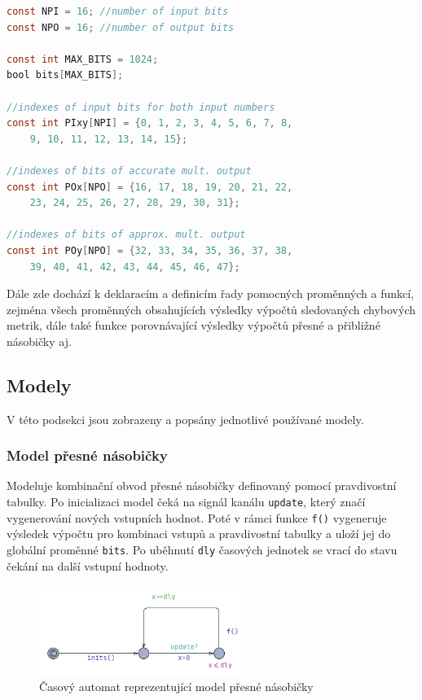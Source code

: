 \begin{lstlisting}[language={C}, caption={Základní rozhraní systému}, label={lst:interface}]
const NPI = 16; //number of input bits
const NPO = 16; //number of output bits

const int MAX_BITS = 1024;
bool bits[MAX_BITS];

//indexes of input bits for both input numbers
const int PIxy[NPI] = {0, 1, 2, 3, 4, 5, 6, 7, 8,
    9, 10, 11, 12, 13, 14, 15};

//indexes of bits of accurate mult. output
const int POx[NPO] = {16, 17, 18, 19, 20, 21, 22,
    23, 24, 25, 26, 27, 28, 29, 30, 31};

//indexes of bits of approx. mult. output
const int POy[NPO] = {32, 33, 34, 35, 36, 37, 38,
    39, 40, 41, 42, 43, 44, 45, 46, 47};
\end{lstlisting}

Dále zde dochází k deklaracím a definicím řady pomocných proměnných a funkcí, zejména všech proměnných obsahujících výsledky výpočtů sledovaných chybových metrik, dále také funkce porovnávající výsledky výpočtů přesné a přibližné násobičky aj.

\subsection{Modely}
V této podsekci jsou zobrazeny a popsány jednotlivé používané modely.

\subsubsection{Model přesné násobičky}
Modeluje kombinační obvod přesné násobičky definovaný pomocí pravdivostní tabulky. Po inicializaci model čeká na signál kanálu \texttt{update}, který značí vygenerování nových vstupních hodnot. Poté v rámci funkce \texttt{f()} vygeneruje výsledek výpočtu pro kombinaci vstupů a pravdivostní tabulky a uloží jej do globální proměnné \texttt{bits}. Po uběhnutí \texttt{dly} časových jednotek se vrací do stavu čekání na další vstupní hodnoty.

\begin{figure}[H]
    \centering
    \includegraphics[width=0.6\textwidth]{obrazky-figures/model_tmul2any.png}
    \caption{Časový automat reprezentující model přesné násobičky}
    \label{fig:model_tmul2any}
\end{figure}


